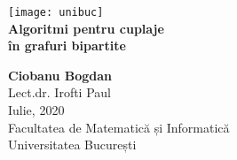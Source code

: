 \begin{titlepage}
  \vspace{1 in}
  \begin{center}
    \texttt{[image: unibuc]}
    \\
    \huge
    \textbf{Algoritmi pentru cuplaje \\ în grafuri bipartite} \\
    \vspace{0.8 in}

    \Large
    \textbf{Ciobanu Bogdan} \\
    Lect.dr. Irofti Paul \\

    \vspace*{\fill}
    Iulie, 2020 \\
    Facultatea de Matematică și Informatică\\
    Universitatea București \\

  \end{center}
\end{titlepage}
